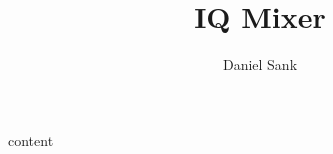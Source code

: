 \documentclass{article}
\author{Daniel Sank}
\title{IQ Mixer}
\begin{document}
\maketitle

{content}

 
\end{document}
